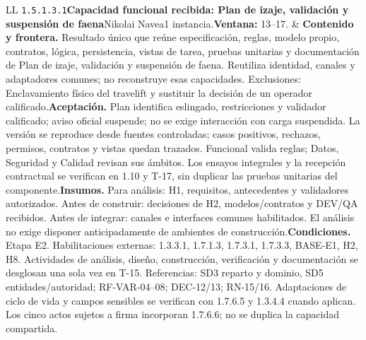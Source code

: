 \begin{longtable}{L{\tabcolsep\relax}L{\tabcolsep\relax}}
\texttt{1.\allowbreak{}5.\allowbreak{}1.\allowbreak{}3.\allowbreak{}1}\newline{}\textbf{Capacidad funcional recibida: Plan de izaje, validación y suspensión de faena}\newline{}Nikolai Navea\newline{}1 instancia.\newline{}\textbf{Ventana:} 13--17. & \textbf{Contenido y frontera.} Resultado único que reúne especificación, reglas, modelo propio, contratos, lógica, persistencia, vistas de tarea, pruebas unitarias y documentación de Plan de izaje, validación y suspensión de faena. Reutiliza identidad, canales y adaptadores comunes; no reconstruye esas capacidades. Exclusiones: Enclavamiento físico del travelift y sustituir la decisión de un operador calificado.\newline{}\textbf{Aceptación.} Plan identifica eslingado, restricciones y validador calificado; aviso oficial suspende; no se exige interacción con carga suspendida. La versión se reproduce desde fuentes controladas; casos positivos, rechazos, permisos, contratos y vistas quedan trazados. Funcional valida reglas; Datos, Seguridad y Calidad revisan sus ámbitos. Los ensayos integrales y la recepción contractual se verifican en 1.10 y T-17, sin duplicar las pruebas unitarias del componente.\newline{}\textbf{Insumos.} Para análisis: H1, requisitos, antecedentes y validadores autorizados. Antes de construir: decisiones de H2, modelos/contratos y DEV/QA recibidos. Antes de integrar: canales e interfaces comunes habilitados. El análisis no exige disponer anticipadamente de ambientes de construcción.\newline{}\textbf{Condiciones.} Etapa E2. Habilitaciones externas: 1.3.3.1, 1.7.1.3, 1.7.3.1, 1.7.3.3, BASE-E1, H2, H8. Actividades de análisis, diseño, construcción, verificación y documentación se desglosan una sola vez en T-15. Referencias: SD3 reparto y dominio, SD5 entidades/autoridad; RF-VAR-04--08; DEC-12/13; RN-15/16. Adaptaciones de ciclo de vida y campos sensibles se verifican con 1.7.6.5 y 1.3.4.4 cuando aplican. Los cinco actos sujetos a firma incorporan 1.7.6.6; no se duplica la capacidad compartida.\\\hline

\end{longtable}
